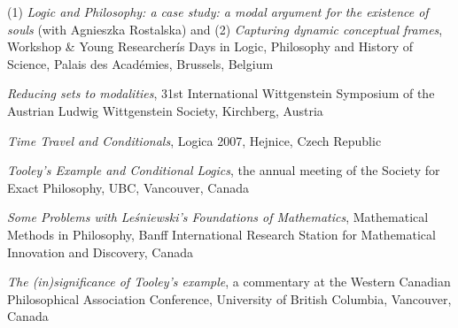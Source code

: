 \documentclass[10pt, a4paper]{article}
\newcommand{\years}[1]{\marginnote{\normalsize #1}}
\begin{document}
(1) \emph{Logic and Philosophy: a case study: a modal argument for the existence of souls}  (with Agnieszka  Rostalska) and (2) \emph{Capturing dynamic conceptual frames}, Workshop \& Young Researcherís Days in Logic, Philosophy and History of Science,  Palais des Acad\'emies, Brussels, Belgium






\vspace{0.5mm}


 \emph{Reducing sets to modalities}, 31st  International \mbox{Wittgenstein} Symposium of the Austrian Ludwig \mbox{Wittgenstein} Society,  Kirchberg, Austria



\vspace{0.5mm}










 \emph{Time Travel and Conditionals},   Logica 2007,   Hejnice, Czech Republic





\vspace{0.5mm}


  \emph{Tooley's Example and Conditional Logics}, the annual meeting of the Society for Exact Philosophy,      UBC, Vancouver, Canada



\vspace{0.5mm}


 \emph{Some Problems with Le\'sniewski's Foundations of Mathematics},  Mathematical  Methods in Philosophy,  Banff
International Research Station for Mathematical Innovation and Discovery, Canada


\vspace{0.5mm}


\years{2006} \emph{The (in)significance of Tooley's example}, a commentary at the   Western Canadian Philosophical Association Conference,  University of British Columbia, Vancouver, Canada
\end{document}
